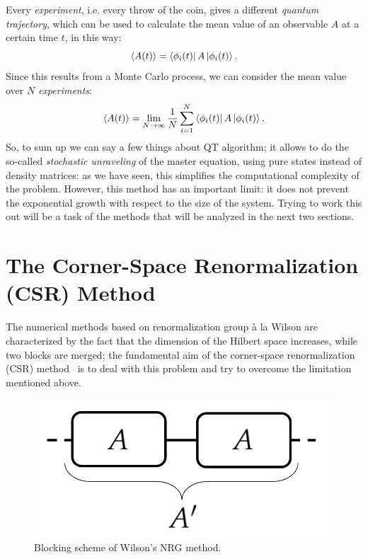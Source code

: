 Every \emph{experiment}, i.e. every throw of the coin, gives a different \emph{quantum trajectory}, which can be used to calculate the mean value of an observable $A$ at a certain time $t$, in this way:
\begin{equation}
    \langle A(t)\rangle = \bra{\phi_i(t)}A\ket{\phi_i(t)}.
\end{equation}
Since this results from a Monte Carlo process, we can consider the mean value over $N$ \emph{experiments}:
\begin{equation}
    \langle A(t)\rangle = \lim_{N\to\infty} \frac{1}{N}\sum_{i=1}^{N}\bra{\phi_i(t)}A\ket{\phi_i(t)}.
\end{equation}
So, to sum up we can say a few things about QT algorithm; it allows to do the so-called \emph{stochastic unraveling} of the master equation, using pure states instead of density matrices: as we have seen, this simplifies the computational complexity of the problem. However, this method has an important limit: it does not prevent the exponential growth with respect to the size of the system. Trying to work this out will be a task of the methods that will be analyzed in the next two sections.

\section{The Corner-Space Renormalization (CSR) Method}
\label{chapter3_csr}
The numerical methods based on renormalization group à la Wilson are characterized by the fact that the dimension of the Hilbert space increases, while two blocks are merged; the fundamental aim of the corner-space renormalization (CSR) method~\cite{PhysRevLett.115.080604} is to deal with this problem and try to overcome the limitation mentioned above. 


\begin{figure}[H]
    \centering
    \includegraphics[scale=0.3]{Figures/wilson.png}
    \captionsetup{width=1.\linewidth}
    \caption{Blocking scheme of Wilson's NRG method.}
    \label{fig:wilson}
\end{figure}

